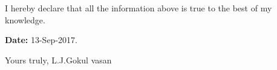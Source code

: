 \documentclass[letterpaper]{twentysecondcv} %
\begin{document}
I hereby declare that all the information above is true to the best of my knowledge.  

\vspace{2mm} 
\begin{flushleft}
\textbf{Date:} 13-Sep-2017.\linebreak
\end{flushleft}

\begin{flushright}                                                 					
Yours truly, \linebreak	                                                                
{L.J.Gokul vasan}
\end{flushright}
\end{document}
